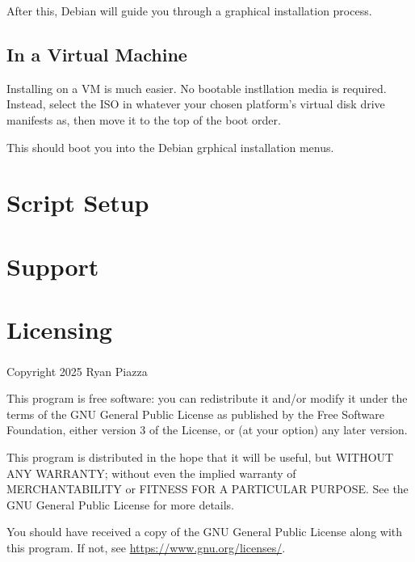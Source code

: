 \documentclass{article}
\begin{document}
After this, Debian will guide you through a graphical installation process. 

\subsection{In a Virtual Machine}

Installing on a VM is much easier. No bootable instllation media is required. Instead, select the ISO in whatever your chosen platform's virtual disk drive manifests as, then move it to the top of the boot order. 

This should boot you into the Debian grphical installation menus. 

\section{Script Setup}

\blindtext

\section{Support}

\blindtext

\section{Licensing}

  Copyright \textsuperscript{\textcopyright} 2025 Ryan Piazza

    This program is free software: you can redistribute it and/or modify
    it under the terms of the GNU General Public License as published by
    the Free Software Foundation, either version 3 of the License, or
    (at your option) any later version.

    This program is distributed in the hope that it will be useful,
    but WITHOUT ANY WARRANTY; without even the implied warranty of
    MERCHANTABILITY or FITNESS FOR A PARTICULAR PURPOSE.  See the
    GNU General Public License for more details.

    You should have received a copy of the GNU General Public License
    along with this program.  If not, see \href{https://www.gnu.org/licenses/}{https://www.gnu.org/licenses/}.
\end{document}
